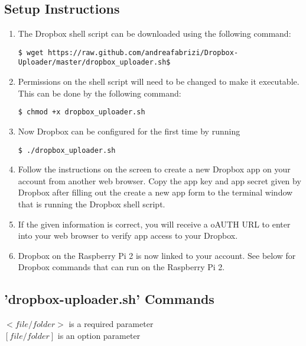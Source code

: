 \subsection{Setup Instructions}
\begin{enumerate}
\item The Dropbox shell script can be downloaded using the following command:
\begin{verbatim}$ wget https://raw.github.com/andreafabrizi/Dropbox-Uploader/master/dropbox_uploader.sh$
\end{verbatim}
\item Permissions on the shell script will need to be changed to make it executable. This can be done by the following command:
\begin{verbatim}$ chmod +x dropbox_uploader.sh 
\end{verbatim}
\item Now Dropbox can be configured for the first time by running 
\begin{verbatim}$ ./dropbox_uploader.sh 
\end{verbatim}
\item Follow the instructions on the screen to create a new Dropbox app on your account from another web browser.  Copy the app key and app secret given by Dropbox after filling out the create a new app form to the terminal window that is running the Dropbox shell script.  
\item If the given information is correct, you will receive a oAUTH URL to enter into your web browser to verify app access to your Dropbox.
\item Dropbox on the Raspberry Pi 2 is now linked to your account. See below for Dropbox commands that can run on the Raspberry Pi 2.
\end{enumerate}

\subsection{'dropbox-uploader.sh' Commands}

$<file/folder>$ is a required parameter
\\$[file/folder]$ is an option parameter 

